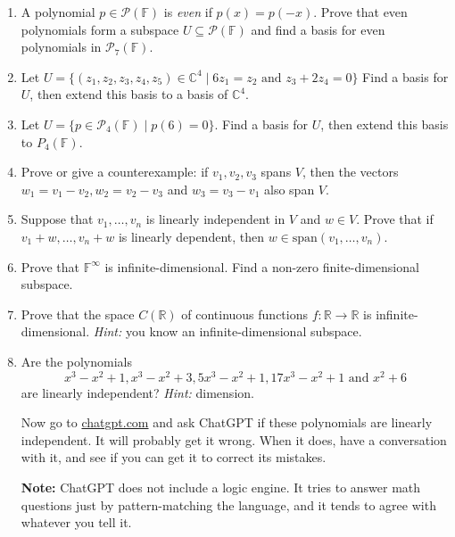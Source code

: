 \documentclass[a4paper,11pt]{article}
\theoremstyle{definition}
\begin{document}
\begin{enumerate}[(1)]
\item 
A polynomial $p\in\mathcal P(\mathbb F)$ is \textit{even} if $p(x) = p(-x)$.
Prove that even polynomials form a subspace $U\subseteq \mathcal P(\mathbb F)$ and find a basis for even polynomials in $\mathcal P_7(\mathbb F)$.

\item
Let $U = 
\{
(z_1,z_2,z_3,z_4,z_5)\in\mathbb C^4
\mid
6z_1=z_2\text{ and }
z_3+2z_4=0
\}
$
Find a basis for $U$, then extend this basis to a basis of $\mathbb C^4$.

\item 
Let $U = \{p\in\mathcal P_4(\mathbb F)\mid p(6)=0\}$.
Find a basis for $U$, then extend this basis to $P_4(\mathbb F)$.

\item
Prove or give a counterexample:
if $v_1, v_2, v_3$ spans $V$, then the vectors
$w_1 = v_1 - v_2, w_2 = v_2 - v_3$ and $w_3 = v_3- v_1$ also span $V$.

\item 
Suppose that $v_1,\dots,v_n$ is linearly independent in $V$ and $w\in V$.
Prove that if $v_1+w,\dots,v_n+w$ is linearly dependent, then $w\in\text{span}(v_1,\dots,v_n)$.


\item 
Prove that $\mathbb F^\infty$ is infinite-dimensional.
Find a non-zero finite-dimensional subspace.

\item 
Prove that the space $C(\mathbb R)$ of continuous functions $f
:\mathbb R\to\mathbb R$ is infinite-dimensional.
\textit{Hint:} you know an infinite-dimensional subspace.

\item
Are the polynomials
\[
x^3-x^2+1 ,x^3-x^2+3, 5x^3-x^2+1, 17x^3-x^2+1\text{ and } x^2+6
\]
are linearly independent? \textit{Hint:} dimension.

Now go to \href{https://chat.openai.com/}{chatgpt.com} and ask ChatGPT if these polynomials are linearly independent.
It will probably get it wrong.
When it does, have a conversation with it, and see if you can get it to correct its mistakes.

\noindent
\textbf{Note:}
ChatGPT does not include a logic engine. It tries to answer math questions just by
pattern-matching the language, and it tends to agree with whatever you tell it.
\end{enumerate}
\end{document}
